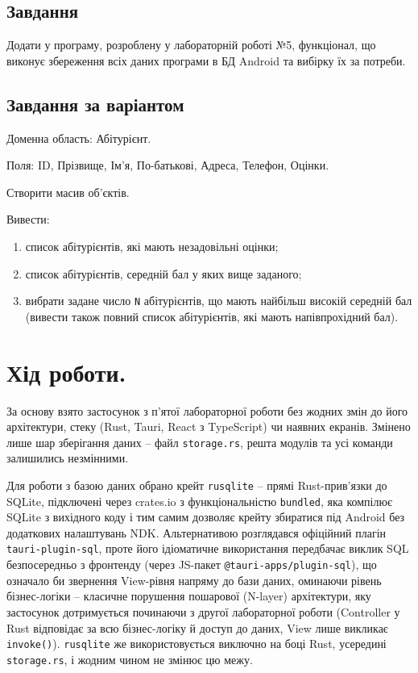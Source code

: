 \documentclass[14pt, a4paper]{extreport}
\begin{document}
	\subsection*{Завдання}
	
	Додати у програму, розроблену у лабораторній роботі №5, функціонал, що виконує збереження всіх даних програми в БД Android та вибірку їх за потреби.
	
	\subsection*{Завдання за варіантом}
	
	Доменна область: Абітурієнт. 
	
	Поля:  ID, Прізвище, Ім'я, По-батькові, Адреса, Телефон, Оцінки. 
	
	Створити масив об'єктів. 
	
	Вивести:
	
	\begin{enumerate}[label=\alph*.]
		\item список абітурієнтів, які мають незадовільні оцінки;
		
		\item список абітурієнтів, середній бал у яких вище заданого;
		
		\item вибрати задане число \texttt{N} абітурієнтів, що мають найбільш високій середній бал (вивести також повний список абітурієнтів, які мають напівпрохідний бал).
	\end{enumerate}
	
	\section*{Хід роботи.}

	За основу взято застосунок з п'ятої лабораторної роботи без жодних змін до його архітектури, стеку (Rust, Tauri, React з TypeScript) чи наявних екранів. Змінено лише шар зберігання даних -- файл \texttt{storage.rs}, решта модулів та усі команди залишились незмінними.
	
	Для роботи з базою даних обрано крейт \texttt{rusqlite} -- прямі Rust-прив'язки до SQLite, підключені через crates.io з функціональністю \texttt{bundled}, яка компілює SQLite з вихідного коду і тим самим дозволяє крейту збиратися під Android без додаткових налаштувань NDK. Альтернативою розглядався офіційний плагін \texttt{tauri-plugin-sql}, проте його ідіоматичне використання передбачає виклик SQL безпосередньо з фронтенду (через JS-пакет \texttt{@tauri-apps/plugin-sql}), що означало би звернення View-рівня напряму до бази даних, оминаючи рівень бізнес-логіки -- класичне порушення пошарової (N-layer) архітектури, яку застосунок дотримується починаючи з другої лабораторної роботи (Controller у Rust відповідає за всю бізнес-логіку й доступ до даних, View лише викликає \texttt{invoke()}). \texttt{rusqlite} же використовується виключно на боці Rust, усередині \texttt{storage.rs}, і жодним чином не змінює цю межу.
	
\end{document}
